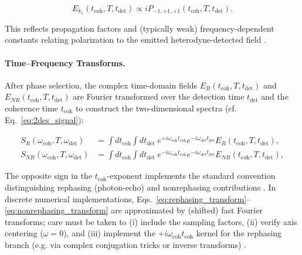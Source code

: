 \begin{equation}
	E_{k_s}(t_{\text{coh}}, T, t_{\text{det}}) \propto i P_{-1,+1,+1}(t_{\text{coh}}, T, t_{\text{det}}).
\end{equation}

\noindent 
This reflects propagation factors and (typically weak) frequency-dependent constants relating polarization to the emitted heterodyne-detected field \cite{mukamel1995principlesnonlinearoptical, greenetal2024vibrationalcoherenceshalfbroadband}.


\paragraph{Time--Frequency Transforms.}

\noindent 
After phase selection, the complex time-domain fields $E_{R}(t_{\text{coh}}, T, t_{\text{det}})$ and $E_{NR}(t_{\text{coh}}, T, t_{\text{det}})$ are Fourier transformed over the detection time $t_{\text{det}}$ and the coherence time $t_{\text{coh}}$ to construct the two-dimensional spectra (cf. Eq.~\eqref{eq:2des_signal}):

\begin{align}
	S_{R}(\omega_{\text{coh}}, T, \omega_{\text{det}})
	 & =
	\int dt_{\text{coh}} \int dt_{\text{det}} \;
	e^{+ i \omega_{\text{coh}} t_{\text{coh}}} e^{- i \omega_{\text{det}} t_{\text{det}}}
	E_{R}(t_{\text{coh}}, T, t_{\text{det}}),
	\label{eq:rephasing_transform} \\
	S_{NR}(\omega_{\text{coh}}, T, \omega_{\text{det}})
	 & =
	\int dt_{\text{coh}} \int dt_{\text{det}} \;
	e^{- i \omega_{\text{coh}} t_{\text{coh}}} e^{- i \omega_{\text{det}} t_{\text{det}}}
	E_{NR}(t_{\text{coh}}, T, t_{\text{det}}),
	\label{eq:nonrephasing_transform}
\end{align}

\noindent 
The opposite sign in the $t_{\text{coh}}$-exponent implements the standard convention distinguishing rephasing (photon-echo) and nonrephasing contributions \cite{cho2009twodimensionalopticalspectroscopy, greenetal2024vibrationalcoherenceshalfbroadband}. In discrete numerical implementations, Eqs.~\eqref{eq:rephasing_transform}--\eqref{eq:nonrephasing_transform} are approximated by (shifted) fast Fourier transforms; care must be taken to (i) include the sampling factors, (ii) verify axis centering ($\omega=0$), and (iii) implement the $+i\omega_{\text{coh}} t_{\text{coh}}$ kernel for the rephasing branch (e.g. via complex conjugation tricks or inverse transforms) \cite{cho2009twodimensionalopticalspectroscopy, greenetal2024vibrationalcoherenceshalfbroadband}.

